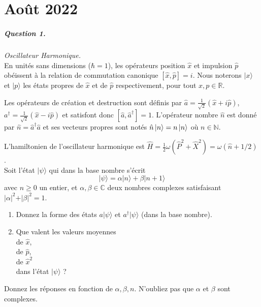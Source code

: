 \chapter{Août 2022}

\paragraph{Question 1.} \textit{Oscillateur Harmonique.}\\

En unités sans dimensions ($\hbar=1$), les opérateurs position $\hat x$ et impulsion $\hat p$ obéissent à la relation de commutation canonique $[\hat x, \hat p]=i $.  Nous noterons $\lvert x \rangle$ et $\lvert p \rangle$ les états propres de $\hat x$ et de $\hat p $ respectivement, pour tout $x, p \in \mathbb{R}$.

Les opérateurs de création et destruction sont définis par 
$\hat a= \frac{1}{\sqrt{2}}(\hat x+i\hat p)$, $a^\dagger= \frac{1}{\sqrt{2}}(\hat x-i\hat p)$ et satisfont donc $[\hat a,\hat a^\dagger]=1$. L'opérateur nombre $\hat n$ est donné par $\hat n= \hat a^\dagger \hat a$ et ses vecteurs propres sont notés $\hat n \ket{n} =n \ket{n}$ où $n \in \mathbb{N}$. 

L'hamiltonien de l'oscillateur harmonique est $\hat H = \frac{1}{2}\omega ( \hat P^2 + \hat X^2 ) = \omega (\hat n + 1/2)\ $. \\

Soit l'état $\vert \psi \rangle$ qui dans la base nombre s'écrit
\begin{equation}
\vert \psi \rangle = \alpha \vert n \rangle + \beta \vert n+1 \rangle 
\end{equation}
avec $n\geq 0$ un entier, et $\alpha,\beta \in \mathbb{C}$ deux nombres complexes satisfaisant $\vert \alpha \vert^2 + \vert \beta \vert^2=1$.

\begin{enumerate}
\item 
Donnez la forme des états $a \vert \psi \rangle$ et $a^\dagger \vert \psi \rangle$ (dans la base nombre).
\item
Que valent les valeurs moyennes\\
de $\hat x$, \\
de $\hat p$, \\
de $\hat x^2$\\
dans l'état $\vert \psi \rangle$ ?

\end{enumerate}
Donnez les réponses 
en fonction de $\alpha, \beta, n$. N'oubliez pas que $\alpha$ et $\beta$ sont complexes.

